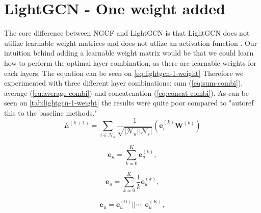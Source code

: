 \section{LightGCN - One weight added}\label{app:lightgcn-1-weight}
The core difference between NGCF and LightGCN is that LightGCN does not utilize learnable weight matrices and does not utlize an activation function \cite{lightgcn,NGCF_2019}.
Our intuition behind adding a learnable weight matrix would be that we could learn how to perform the optimal layer combination, as there are learnable weights for each layers.
The equation can be seen on \autoref{eq:lightgcn-1-weight}
Therefore we experimented with three different layer combinations: sum (\autoref{eq:sum-combi}), average (\autoref{eq:average-combi}) and concatenation (\autoref{eq:concat-combi}).
As can be seen on \autoref{tab:lightgcn-1-weight} the results were quite poor compared to "autoref this to the baseline methods."
\begin{equation}
    E^{(k+1)} = \sum_{i \in \mathcal{N}_u} \frac{1}{\sqrt{|\mathcal{N}_u||\mathcal{N}_i|}}\left( \mathbf{e}_i^{(k)} \mathbf{W}^{(k)} \right)
    \label{eq:lightgcn-1-weight}
\end{equation}

\begin{equation}
    \mathbf{e}_u = \sum_{k=0}^{K} \mathbf{e}_u^{(k)},
    \label{eq:sum-combi}
\end{equation}

\begin{equation}
    \mathbf{e}_u = \sum_{k=0}^{K} \frac{1}{k} \mathbf{e}_u^{(k)},
    \label{eq:average-combi}
\end{equation}

\begin{equation}
    \mathbf{e}_u = \mathbf{e}_u^{(0)}|| \cdots || \mathbf{e}_u^{(K)},
    \label{eq:concat-combi}
\end{equation}

